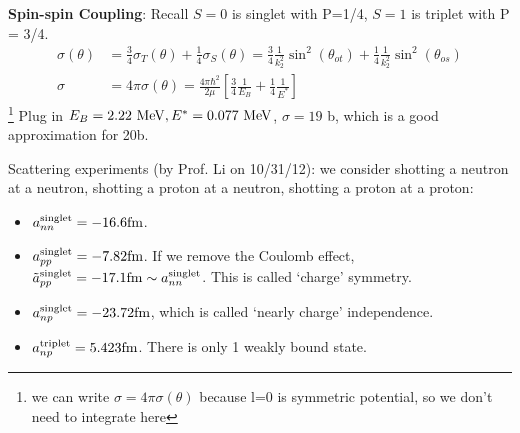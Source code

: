 \documentclass{school-22.101-notes}
\begin{document}
\textbf{Spin-spin Coupling}: Recall $S=0$ is singlet with P=1/4, $S=1$ is triplet with P = 3/4. 
\begin{align}
\sigma( \theta) &= \frac{3}{4} \sigma_T (\theta) + \frac{1}{4} \sigma_S (\theta) = \frac{3}{4} \frac{1}{k_2^2} \sin^2 (\theta_{ot} ) + \frac{1}{4} \frac{1}{k_2^2} \sin^2 (\theta_{os} ) \\
\sigma &= 4 \pi \sigma (\theta) = \frac{4 \pi \hbar^2}{2 \mu} \left[ \frac{3}{4} \frac{1}{E_B} + \frac{1}{4} \frac{1}{E^*} \right] 
\end{align}\footnote{we can write $\sigma = 4 \pi \sigma(\theta)$ because l=0 is symmetric potential, so we don't need to integrate here} 
Plug in $E_B = 2.22 \mbox{ } \mathrm{MeV}, E^* = 0.077 \mbox{ } \mathrm{MeV}$, $\sigma = 19$ b, which is a good approximation for 20b. 


Scattering experiments (by Prof. Li on 10/31/12): 
we consider shotting a neutron at a neutron, shotting a proton at a neutron, shotting a proton at a proton: 
\begin{itemize}
\item $\displaystyle a^{\mathrm{singlet}}_{nn} = -16.6 \mathrm{fm}$. 
\item $\displaystyle a^{\mathrm{singlet}}_{pp} = -7.82 \mathrm{fm}$. If we remove the Coulomb effect, $\displaystyle \tilde{a}^{\mathrm{singlet}}_{pp} = -17.1 \mathrm{fm} \sim a^{\mathrm{singlet}}_{nn}$. This is called `charge' symmetry. 
\item $\displaystyle a^{\mathrm{singlet}}_{np} = -23.72 \mathrm{fm}$, which is called `nearly charge' independence. 
\item $\displaystyle a^{\mathrm{triplet}}_{np} = 5.423 \mathrm{fm}$. There is only 1 weakly bound state. 
\end{itemize}
\end{document}
